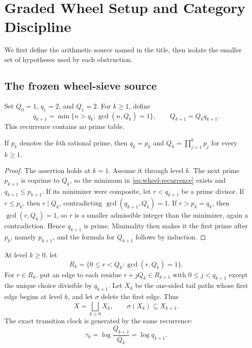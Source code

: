 \section{Graded Wheel Setup and Category Discipline}
\label{sec:setup}

We first define the arithmetic source named in the title, then isolate the
smaller set of hypotheses used by each obstruction.

\subsection{The frozen wheel-sieve source}

Set $Q_0=1$, $q_1=2$, and $Q_1=2$.  For $k\geq1$, define
\begin{equation}
  q_{k+1}=\min\{n>q_k:\gcd(n,Q_k)=1\},
  \qquad Q_{k+1}=Q_kq_{k+1}.
  \label{eq:wheel-recurrence}
\end{equation}
This recurrence contains no prime table.

\begin{lemma}
\label{lem:prime-enumeration}
If $p_k$ denotes the $k$th rational prime, then
$q_k=p_k$ and $Q_k=\prod_{j=1}^k p_j$ for every $k\geq1$.
\end{lemma}

\begin{proof}
The assertion holds at $k=1$.  Assume it through level $k$.  The next prime
$p_{k+1}$ is coprime to $Q_k$, so the minimum in
\eqref{eq:wheel-recurrence} exists and $q_{k+1}\leq p_{k+1}$.  If its
minimizer were composite, let $r<q_{k+1}$ be a prime divisor.  If
$r\leq p_k$, then $r\mid Q_k$, contradicting
$\gcd(q_{k+1},Q_k)=1$.  If $r>p_k=q_k$, then
$\gcd(r,Q_k)=1$, so $r$ is a smaller admissible integer than the minimizer,
again a contradiction.  Hence $q_{k+1}$ is prime.  Minimality then makes it
the first prime after $p_k$, namely $p_{k+1}$, and the formula for $Q_{k+1}$
follows by induction.
\end{proof}

At level $k\geq0$, let
\begin{equation}
  R_k=\{0\leq r<Q_k:\gcd(r,Q_k)=1\}.
\end{equation}
For $r\in R_k$, put an edge to each residue
$r+jQ_k\in R_{k+1}$ with $0\leq j<q_{k+1}$ except the unique choice
divisible by $q_{k+1}$.  Let $X_k$ be the one-sided tail paths whose first
edge begins at level $k$, and let $\sigma$ delete the first edge.  Thus
\begin{equation}
  X=\bigsqcup_{k\geq 0} X_k,
  \qquad
  \sigma(X_k)\subseteq X_{k+1}.
  \label{eq:graded-space}
\end{equation}
The exact transition clock is generated by the same recurrence:
\begin{equation}
  \tau_k=\log\frac{Q_{k+1}}{Q_k}=\log q_{k+1}.
  \label{eq:wheel-clock}
\end{equation}

